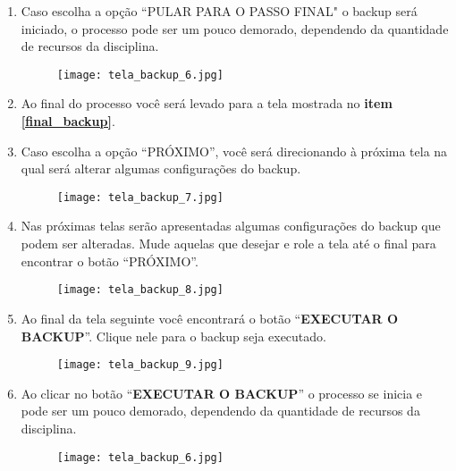 \documentclass[12pt]{report}
\begin{document}
\begin{enumerate}[\bf 1)]
  	\newpage

	\item Caso escolha a op\c{c}\~ao ``PULAR PARA O PASSO FINAL" o backup ser\'a iniciado, o processo pode ser um pouco demorado, dependendo da quantidade de recursos da disciplina.
	\begin{figure}[H]
    	\centering
    	\hspace*{-2.5cm}\texttt{[image: tela\_backup\_6.jpg]}
  	\end{figure}

        \item Ao final do processo você será levado para a tela mostrada no \textbf{item \ref{final_backup}}.
  	\newpage

	\item Caso escolha a op\c{c}\~ao ``PR\'OXIMO'', voc\^e ser\'a direcionando \`a pr\'oxima tela na qual ser\'a alterar algumas configura\c{c}\~oes do backup.
	\begin{figure}[H]
    	\centering
    	\hspace*{-2.5cm}\texttt{[image: tela\_backup\_7.jpg]}
  	\end{figure}

  	\newpage

	\item Nas pr\'oximas telas ser\~ao apresentadas algumas configura\c{c}\~oes do backup que podem ser alteradas. Mude aquelas que desejar e role a tela at\'e o final para encontrar o bot\~ao ``PR\'OXIMO''.
	\begin{figure}[H]
    	\centering
    	\hspace*{-2.5cm}\texttt{[image: tela\_backup\_8.jpg]}
  	\end{figure}

  	\newpage

        \item Ao final da tela seguinte você encontrará o botão ``\textbf{EXECUTAR O BACKUP}''. Clique nele para o backup seja executado.
	\begin{figure}[H]
    	\centering
    	\hspace*{-2.5cm}\texttt{[image: tela\_backup\_9.jpg]}
  	\end{figure}

	\newpage

        \item  Ao clicar no botão ``\textbf{EXECUTAR O BACKUP}'' o processo se inicia e pode ser um pouco demorado, dependendo da quantidade de recursos da disciplina.
	\begin{figure}[H]
    	\centering
    	\hspace*{-2.5cm}\texttt{[image: tela\_backup\_6.jpg]}
  	\end{figure}


\end{enumerate}
\end{document}
